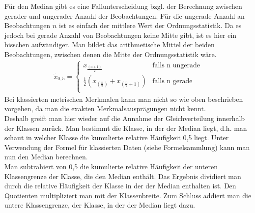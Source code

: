 \documentclass[a4paper]{article}
\begin{document}
\noindent Für den Median gibt es eine Fallunterscheidung bzgl. der Berechnung zwischen gerader und ungerader Anzahl der Beobachtungen. Für die ungerade Anzahl an Beobachtungen $n$ ist es einfach der mittlere Wert der Ordnungsstatistik. Da es jedoch bei gerade Anzahl von Beobachtungen keine Mitte gibt, ist es hier ein bisschen aufwändiger. Man bildet das arithmetische Mittel der beiden Beobachtungen, zwischen denen die Mitte der Ordnungsstatistik wäre.
\begin{align*}
   \tilde{x}_{0,5}=\begin{cases}
			x_{\frac{(n+1)}{2}}     & \text{falls n ungerade}       \\
            \frac{1}{2}(x_{(\frac{n}{2})}+x_{(\frac{n}{2}+1)})  & \text{falls n gerade}\\
		 \end{cases}
\end{align*}
Bei klassierten metrischen Merkmalen kann man nicht so wie oben beschrieben vorgehen, da man die exakten Merkmalsausprägungen nicht kennt.\\
Deshalb greift man hier wieder auf die Annahme der Gleichverteilung innerhalb der Klassen zurück. Man bestimmt die Klasse, in der der Median liegt, d.h. man schaut in welcher Klasse die kumulierte relative Häufigkeit 0,5 liegt. Unter Verwendung der Formel für klassierten Daten (siehe Formelsammlung) kann man nun den Median berechnen.\\
Man subtrahiert von 0,5 die kumulierte relative Häufigkeit der unteren Klassengrenze der Klasse, die den Median enthält. Das Ergebnis dividiert man durch die relative Häufigkeit der Klasse in der der Median enthalten ist. Den Quotienten multipliziert man mit der Klassenbreite. Zum Schluss addiert man die untere Klassengrenze, der Klasse, in der der Median liegt dazu.\\

\noindent {}
\end{document}
